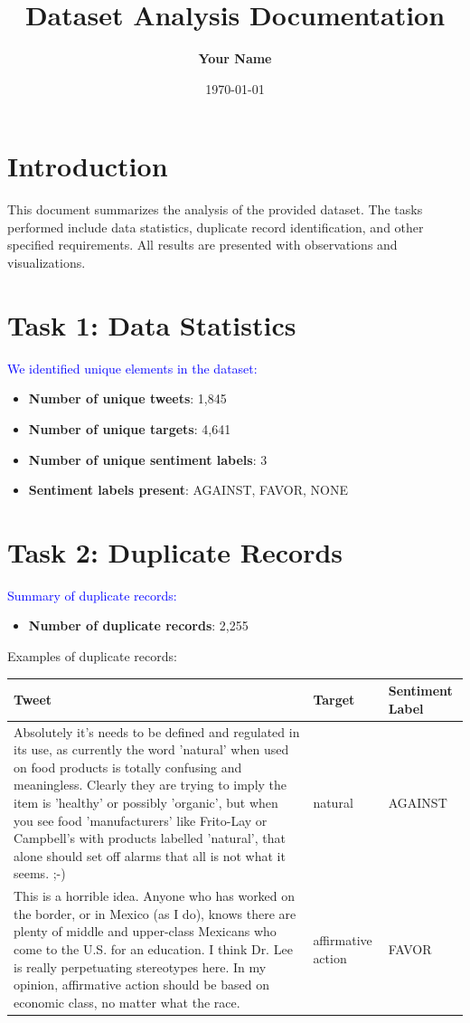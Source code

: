 \documentclass{article}
\title{\textbf{Dataset Analysis Documentation}}
\author{\textbf{Your Name}}
\date{\today}
\begin{document}
\maketitle

\section*{Introduction}
This document summarizes the analysis of the provided dataset. The tasks performed include data statistics, duplicate record identification, and other specified requirements. All results are presented with observations and visualizations.

\section*{Task 1: Data Statistics}
\textcolor{blue}{We identified unique elements in the dataset:}
\begin{itemize}[label=\textbullet, font=\color{blue}]
    \item \textbf{Number of unique tweets}: 1,845
    \item \textbf{Number of unique targets}: 4,641
    \item \textbf{Number of unique sentiment labels}: 3
    \item \textbf{Sentiment labels present}: AGAINST, FAVOR, NONE
\end{itemize}

\section*{Task 2: Duplicate Records}
\textcolor{blue}{Summary of duplicate records:}
\begin{itemize}[label=\textbullet, font=\color{blue}]
    \item \textbf{Number of duplicate records}: 2,255
\end{itemize}

\noindent Examples of duplicate records:
\begin{longtable}{|p{}|p{}|p{}|}
\hline
\textbf{Tweet} & \textbf{Target} & \textbf{Sentiment Label} \\
\hline
Absolutely it's needs to be defined and regulated in its use, as currently the word 'natural' when used on food products is totally confusing and meaningless. Clearly they are trying to imply the item is 'healthy' or possibly 'organic', but when you see food 'manufacturers' like Frito-Lay or Campbell's with products labelled 'natural', that alone should set off alarms that all is not what it seems. ;-) & natural & AGAINST \\
\hline
This is a horrible idea. Anyone who has worked on the border, or in Mexico (as I do), knows there are plenty of middle and upper-class Mexicans who come to the U.S. for an education. I think Dr. Lee is really perpetuating stereotypes here. In my opinion, affirmative action should be based on economic class, no matter what the race. & affirmative action & FAVOR \\
\hline
\end{longtable}
\end{document}
